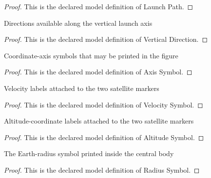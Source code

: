 \begin{proof}
  This is the declared model definition of Launch Path.
\end{proof}
\begin{definition}
  \label{def:physics:phyx-mini-0715:phyxminiproblems-problemphyxmini0715-verticaldirection}
  Directions available along the vertical launch axis
\end{definition}
\begin{proof}
  This is the declared model definition of Vertical Direction.
\end{proof}
\begin{definition}
  \label{def:physics:phyx-mini-0715:phyxminiproblems-problemphyxmini0715-axissymbol}
  Coordinate-axis symbols that may be printed in the figure
\end{definition}
\begin{proof}
  This is the declared model definition of Axis Symbol.
\end{proof}
\begin{definition}
  \label{def:physics:phyx-mini-0715:phyxminiproblems-problemphyxmini0715-velocitysymbol}
  Velocity labels attached to the two satellite markers
\end{definition}
\begin{proof}
  This is the declared model definition of Velocity Symbol.
\end{proof}
\begin{definition}
  \label{def:physics:phyx-mini-0715:phyxminiproblems-problemphyxmini0715-altitudesymbol}
  Altitude-coordinate labels attached to the two satellite markers
\end{definition}
\begin{proof}
  This is the declared model definition of Altitude Symbol.
\end{proof}
\begin{definition}
  \label{def:physics:phyx-mini-0715:phyxminiproblems-problemphyxmini0715-radiussymbol}
  The Earth-radius symbol printed inside the central body
\end{definition}
\begin{proof}
  This is the declared model definition of Radius Symbol.
\end{proof}
